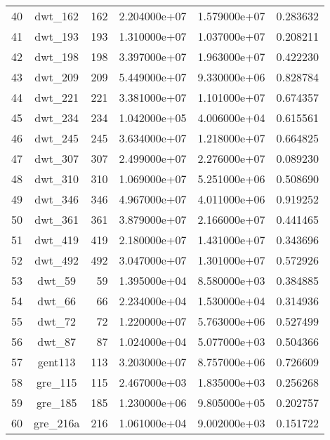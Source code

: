 \documentclass[8pt]{report}
\begin{document}
\begin{table*}
\begin{tabular}{|l|c|r|r|r|r|}
40  &                  dwt\_162 &   162 &  2.204000e+07 &  1.579000e+07 &  0.283632 \\
41  &                  dwt\_193 &   193 &  1.310000e+07 &  1.037000e+07 &  0.208211 \\
42  &                  dwt\_198 &   198 &  3.397000e+07 &  1.963000e+07 &  0.422230 \\
43  &                  dwt\_209 &   209 &  5.449000e+07 &  9.330000e+06 &  0.828784 \\
44  &                  dwt\_221 &   221 &  3.381000e+07 &  1.101000e+07 &  0.674357 \\
45  &                  dwt\_234 &   234 &  1.042000e+05 &  4.006000e+04 &  0.615561 \\
46  &                  dwt\_245 &   245 &  3.634000e+07 &  1.218000e+07 &  0.664825 \\
47  &                  dwt\_307 &   307 &  2.499000e+07 &  2.276000e+07 &  0.089230 \\
48  &                  dwt\_310 &   310 &  1.069000e+07 &  5.251000e+06 &  0.508690 \\
49  &                  dwt\_346 &   346 &  4.967000e+07 &  4.011000e+06 &  0.919252 \\
50  &                  dwt\_361 &   361 &  3.879000e+07 &  2.166000e+07 &  0.441465 \\
51  &                  dwt\_419 &   419 &  2.180000e+07 &  1.431000e+07 &  0.343696 \\
52  &                  dwt\_492 &   492 &  3.047000e+07 &  1.301000e+07 &  0.572926 \\
53  &                   dwt\_59 &    59 &  1.395000e+04 &  8.580000e+03 &  0.384885 \\
54  &                   dwt\_66 &    66 &  2.234000e+04 &  1.530000e+04 &  0.314936 \\
55  &                   dwt\_72 &    72 &  1.220000e+07 &  5.763000e+06 &  0.527499 \\
56  &                   dwt\_87 &    87 &  1.024000e+04 &  5.077000e+03 &  0.504366 \\
57  &                  gent113 &   113 &  3.203000e+07 &  8.757000e+06 &  0.726609 \\
58  &                  gre\_115 &   115 &  2.467000e+03 &  1.835000e+03 &  0.256268 \\
59  &                  gre\_185 &   185 &  1.230000e+06 &  9.805000e+05 &  0.202757 \\
60  &                 gre\_216a &   216 &  1.061000e+04 &  9.002000e+03 &  0.151722 \\

\end{tabular}
\end{table*}
\end{document}
